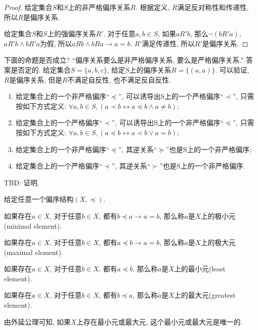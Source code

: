 \begin{proof}
	给定集合$S$和$S$上的非严格偏序关系$R$. 根据定义, $R$满足反对称性和传递性, 所以$R$是偏序关系.
	
	给定集合$S$和$S$上的强偏序关系$R'$. 对于任意$a,b\in S$, 如果$aR'b$, 那么$\neg(bR'a)$, $aR'b\wedge bR'a$为假, 所以$aRb\wedge bRa\rightarrow a=b$. $R'$满足传递性, 所以$R'$是偏序关系.
\end{proof}

下面的命题是否成立? ``偏序关系要么是非严格偏序关系, 要么是严格偏序关系.'' 答案是否定的. 给定集合$S=\{a,b,c\}$, 给定$S$上的偏序关系$R=\{(a,a)\}$. 可以验证, $R$是偏序关系, 但是$R$不满足自反性, 也不满足反自反性.

\begin{proposition}
	\begin{enumerate}
		\item 给定集合上的一个非严格偏序``$\preccurlyeq$'', 可以诱导出S上的一个严格偏序``$\prec$'', 只需按如下方式定义: $\forall a,b\in S, (a\prec b\leftrightarrow a\preccurlyeq b \wedge a\neq b)$;
		\item 给定集合上的一个严格偏序``$\prec$'', 可以诱导出S上的一个非严格偏序``$\preccurlyeq$'', 只需按如下方式定义: $\forall a,b\in S, (a\preccurlyeq b\leftrightarrow a\prec b \vee a=b)$;
		\item 给定集合上的一个非严格偏序``$\preccurlyeq$'', 其逆关系``$\succcurlyeq$''也是S上的一个非严格偏序;
		\item 给定集合上的一个严格偏序``$\prec$'', 其逆关系``$\succ$''也是S上的一个非严格偏序.
	\end{enumerate}
\end{proposition}

TBD: 证明.

\begin{definition}
	给定任意一个偏序结构$(X,\preccurlyeq)$.
	
	如果存在$a\in X$, 对于任意$b\in X$, 都有$b\preccurlyeq a\rightarrow a=b$, 那么称$a$是$X$上的极小元(minimal element).
	
	如果存在$a\in X$, 对于任意$b\in X$, 都有$a\preccurlyeq b\rightarrow a=b$, 那么称$a$是$X$上的极大元(maximal element).
	
	如果存在$a\in X$, 对于任意$b\in X$, 都有$a\preccurlyeq b$, 那么称$a$是$X$上的最小元(least element).
	
	如果存在$a\in X$, 对于任意$b\in X$, 都有$b\preccurlyeq a$, 那么称$a$是$X$上的最大元(greatest element).
\end{definition}

由外延公理可知, 如果$X$上存在最小元或最大元, 这个最小元或最大元是唯一的.

